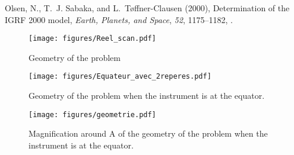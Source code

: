 \documentclass[draft,jgrga]{agutexSI}
\begin{document}
\begin{article}
\begin{thebibliography}{12}
{Olsen}, N., T.~J. {Sabaka}, and L.~{T{\o}ffner-Clausen} (2000), {Determination
  of the IGRF 2000 model}, \textit{Earth, Planets, and Space}, \textit{52},
  1175--1182, .

\end{thebibliography}



%

%
%
\end{article}
\clearpage

\newpage
  \begin{figure}
   \noindent\texttt{[image: figures/Reel\_scan.pdf]}
   \caption{Geometry of the problem} 
   \label{geography_1}
   \end{figure}

  \begin{figure}
   \noindent\texttt{[image: figures/Equateur\_avec\_2reperes.pdf]}
   \caption{Geometry of the problem when the instrument is at the equator.} 
   \label{geography_2}
   \end{figure}
   
  \begin{figure}
   \noindent\texttt{[image: figures/geometrie.pdf]}
   \caption{Magnification around A of the geometry of the problem when the instrument is at the equator.} 
   \label{geometrie}
   \end{figure}
\end{document}
